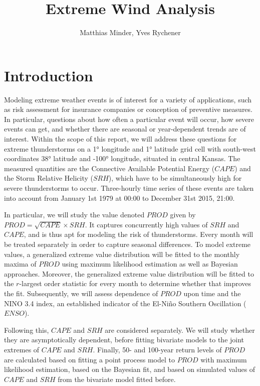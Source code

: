 \documentclass[10pt,conference,compsocconf]{IEEEtran}
\begin{document}
\title{Extreme Wind Analysis}

\author{
	Matthias Minder, Yves Rychener
}

\maketitle

\begin{abstract}

\end{abstract}

\section*{Introduction} 
Modeling extreme weather events is of interest for a variety of applications, such as risk assessment for insurance companies or conception of preventive measures. In particular, questions about how often a particular event will occur, how severe events can get, and whether there are seasonal or year-dependent trends are of interest. Within the scope of this report, we will address these questions for extreme thunderstorms on a 1° longitude and 1° latitude grid cell with south-west coordinates 38° latitude and -100° longitude, situated in central Kansas. The measured quantities are the Connective Available Potential Energy ($CAPE$) and the Storm Relative Helicity ($SRH$), which have to be simultaneously high for severe thunderstorms to occur. Three-hourly time series of these events are taken into account from January 1st 1979 at 00:00 to December 31st 2015, 21:00. 
\par
In particular, we will study the value denoted $PROD$ given by $PROD = \sqrt{CAPE} \times SRH$. It captures concurrently high values of $SRH$ and $CAPE$, and is thus apt for modeling the risk of thunderstorms. Every month will be treated separately in order to capture seasonal differences. To model extreme values, a generalized extreme value distribution will be fitted to the monthly maxima of $PROD$ using maximum likelihood estimation as well as Bayesian approaches. Moreover, the generalized extreme value distribution will be fitted to the $r$-largest order statistic for every month to determine whether that improves the fit. Subsequently, we will assess dependence of $PROD$ upon time and the NINO 3.4 index, an established indicator of the El-Niño Southern Oscillation ($ENSO$). 
\par
Following this, $CAPE$ and $SRH$ are considered separately. We will study whether they are asymptotically dependent, before fitting bivariate models to the joint extremes of $CAPE$ and $SRH$. 
Finally, 50- and 100-year return levels of $PROD$ are calculated based on fitting a point process model to $PROD$ with maximum likelihood estimation, based on the Bayesian fit, and based on simulated values of $CAPE$ and $SRH$ from the bivariate model fitted before. 
\end{document}
